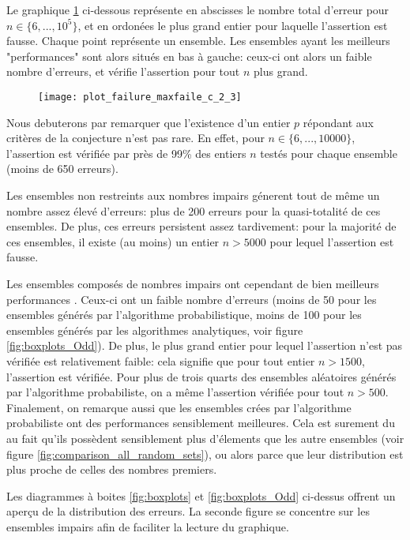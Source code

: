 \documentclass[../main.text]{report}
\begin{document}
Le graphique \ref{fig:failures_2_3} ci-dessous représente en abscisses le nombre total d'erreur pour $n \in \{6,...,10^5\}$, et en ordonées le plus grand entier pour laquelle l'assertion est fausse. Chaque point représente un ensemble. Les ensembles ayant les meilleurs "performances" sont alors situés en bas à gauche: ceux-ci ont alors un faible nombre d'erreurs, et vérifie l'assertion pour tout $n$ plus grand. 

\begin{figure}[H]
\centering
\texttt{[image: plot\_failure\_maxfaile\_c\_2\_3]}
\caption{}
\label{fig:failures_2_3}
\end{figure}

Nous debuterons par remarquer que l'existence d'un entier $p$ répondant aux critères de la conjecture n'est pas rare. En effet, pour $ n \in \{6,...,10000\}$, l'assertion est vérifiée par près de 99\% des entiers $n$ testés pour chaque ensemble (moins de 650 erreurs). 

Les ensembles non restreints aux nombres impairs génerent tout de même un nombre assez élevé d'erreurs: plus de 200 erreurs pour la quasi-totalité de ces ensembles.
De plus, ces erreurs persistent assez tardivement: pour la majorité de ces ensembles, il existe (au moins) un entier $n > 5000$ pour lequel l'assertion est fausse. 


Les ensembles composés de nombres impairs ont cependant de bien meilleurs performances . Ceux-ci ont un faible nombre d'erreurs (moins de 50 pour les ensembles générés par l'algorithme probabilistique, moins de 100 pour les ensembles générés par les algorithmes analytiques, voir figure \ref{fig:boxplots_Odd}). 
De plus, le plus grand entier pour lequel l'assertion n'est pas vérifiée est relativement faible: cela signifie que pour tout entier $n > 1500$, l'assertion est vérifiée. Pour plus de trois quarts des ensembles aléatoires générés par l'algorithme probabiliste, on a même l'assertion vérifiée pour tout $n > 500$.
Finalement, on remarque aussi que les ensembles crées par l'algorithme probabiliste ont des performances sensiblement meilleures. Cela est surement du au fait qu'ils possèdent sensiblement plus d'élements que les autre ensembles (voir figure \ref{fig:comparison_all_random_sets}), ou alors parce que leur distribution est plus proche de celles des nombres premiers.

Les diagrammes à boites \ref{fig:boxplots} et \ref{fig:boxplots_Odd} ci-dessus offrent un aperçu de la distribution des erreurs. La seconde figure se concentre sur les ensembles impairs afin de faciliter la lecture du graphique.
\end{document}
